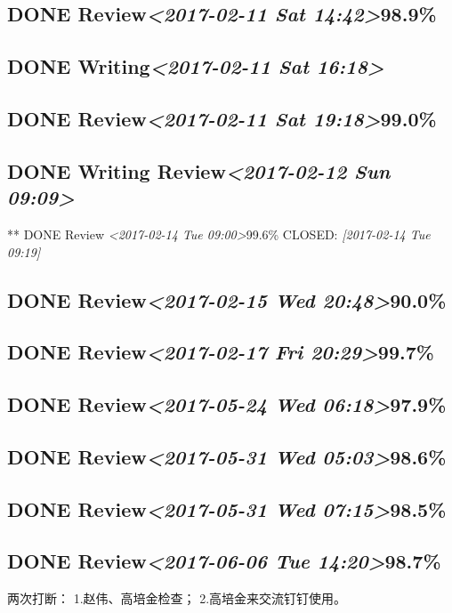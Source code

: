 \documentclass[11pt]{ctexart}
\begin{document}
\subsection{{\bfseries\sffamily DONE} Review\textit{<2017-02-11 Sat 14:42>}98.9\%}
\label{sec:org0eda226}
\subsection{{\bfseries\sffamily DONE} Writing\textit{<2017-02-11 Sat 16:18>}}
\label{sec:org3b5fce1}
\subsection{{\bfseries\sffamily DONE} Review\textit{<2017-02-11 Sat 19:18>}99.0\%}
\label{sec:orga2e5625}
\subsection{{\bfseries\sffamily DONE} Writing Review\textit{<2017-02-12 Sun 09:09>}}
\label{sec:orgdf94798}
** DONE Review \textit{<2017-02-14 Tue 09:00>}99.6\%
  CLOSED: \textit{[2017-02-14 Tue 09:19]}
\subsection{{\bfseries\sffamily DONE} Review\textit{<2017-02-15 Wed 20:48>}90.0\%}
\label{sec:orged4bdf4}
\subsection{{\bfseries\sffamily DONE} Review\textit{<2017-02-17 Fri 20:29>}99.7\%}
\label{sec:orge04b780}
\subsection{{\bfseries\sffamily DONE} Review\textit{<2017-05-24 Wed 06:18>}97.9\%}
\label{sec:org2e5f53f}
\subsection{{\bfseries\sffamily DONE} Review\textit{<2017-05-31 Wed 05:03>}98.6\%}
\label{sec:orgca7d83e}
\subsection{{\bfseries\sffamily DONE} Review\textit{<2017-05-31 Wed 07:15>}98.5\%}
\label{sec:orgead6676}
\subsection{{\bfseries\sffamily DONE} Review\textit{<2017-06-06 Tue 14:20>}98.7\%}
\label{sec:org1f9d7e5}
两次打断：
1.赵伟、高培金检查；
2.高培金来交流钉钉使用。
\end{document}

